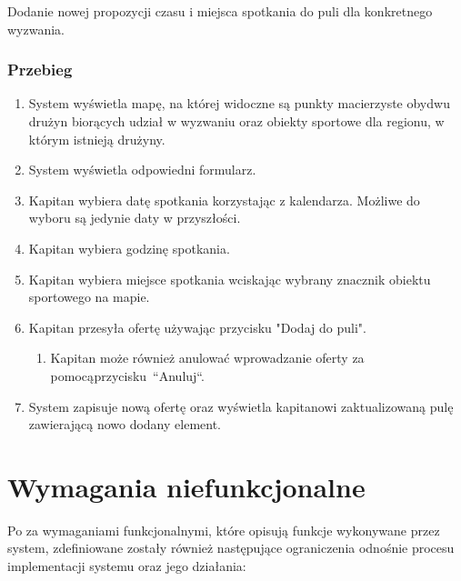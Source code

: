 Dodanie nowej propozycji czasu i miejsca spotkania do puli dla konkretnego wyzwania.

\subsubsection{Przebieg}


\begin{enumerate}
  \item System wyświetla mapę, na której widoczne są punkty macierzyste obydwu drużyn biorących udział w wyzwaniu oraz obiekty sportowe dla regionu, w którym istnieją drużyny.
  \item System wyświetla odpowiedni formularz.
  \item Kapitan wybiera datę spotkania korzystając z kalendarza. Możliwe do wyboru są jedynie daty w przyszłości.
  \item Kapitan wybiera godzinę spotkania.
  \item Kapitan wybiera miejsce spotkania wciskając wybrany znacznik obiektu sportowego na mapie.
  \item Kapitan przesyła ofertę używając przycisku "Dodaj do puli".
  \begin{enumerate}[label=(\alph*)]
     \item Kapitan może również anulować wprowadzanie oferty za pomocą\linebreak przycisku~``Anuluj``.
   \end{enumerate}
 \item System zapisuje nową ofertę oraz wyświetla kapitanowi zaktualizowaną pulę zawierającą nowo dodany element.
\end{enumerate}

\section{Wymagania niefunkcjonalne}

Po za wymaganiami funkcjonalnymi, które opisują funkcje wykonywane przez system, zdefiniowane zostały również następujące ograniczenia odnośnie procesu implementacji systemu oraz jego działania:


